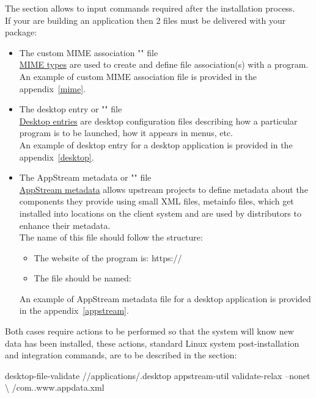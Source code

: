 The  section allows to input commands required after the installation process. \\
If your are building an application then 2 files must be delivered with your package:
\begin{itemize}
\item The custom MIME association "" file \\[0.25cm]
\href{https://help.gnome.org/admin/system-admin-guide/stable/mime-types.html.en}{MIME types} are used to create and define file association(s) with a program. \\ 
An example of custom MIME association file is provided in the appendix~\ref{mime}.
\item The desktop entry or "" file \\[0.25cm]
\href{https://specifications.freedesktop.org/desktop-entry-spec/latest/}{Desktop entries} are desktop configuration files describing 
how a particular program is to be launched, how it appears in menus, etc. \\
An example of desktop entry for a desktop application is provided in the appendix~\ref{desktop}.
\item The AppStream metadata or "" file \\[0.25cm]
\href{https://www.freedesktop.org/software/appstream/docs/}{AppStream metadata} allows upstream projects to define metadata 
about the components they provide using small XML files, metainfo files, which get installed into locations on the client system 
and are used by distributors to enhance their metadata. \\ 
The name of this file should follow the structure:
\vspace{-0.125cm}
\begin{center}\end{center}
\vspace{-0.25cm}
\begin{itemize}
\item The website of the program is: \quad https://
\item The file should be named: \quad\qquad {}
\end{itemize}
An example of AppStream metadata file for a desktop application is provided in the appendix~\ref{appstream}.
\end{itemize}
Both cases require actions to be performed so that the system will know new data has been installed,
these actions, standard Linux system post-installation and integration commands, are to be described in the  section:
{\footnotesize{
\begin{script}
desktop-file-validate //applications/.desktop
appstream-util validate-relax --nonet \textbackslash
\tabul {}/com..www.appdata.xml
\end{script}
}}

